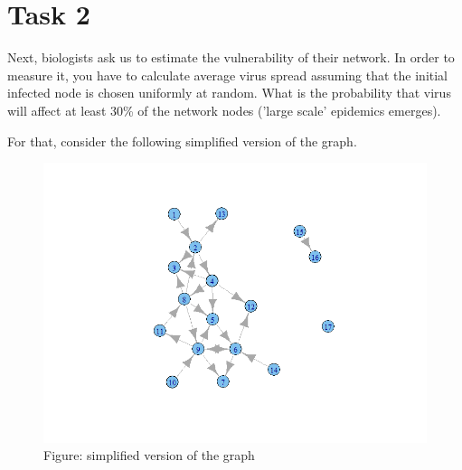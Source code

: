 \documentclass{article}
\begin{document}
\section*{Task 2}
Next, biologists ask us to estimate the vulnerability of their network. In order to measure it, you have to calculate average virus spread assuming that the initial infected node is chosen uniformly at random. What is the probability that virus will affect at least 30\% of the network nodes ('large scale' epidemics emerges).

For that, consider the following simplified version of the graph. 
\begin{figure}[H]
    \centering
    \includegraphics[width=1\textwidth]{Graph.png}
    \caption{Figure: simplified version of the graph}
    \label{fig:awesome_image}
\end{figure}
\end{document}
